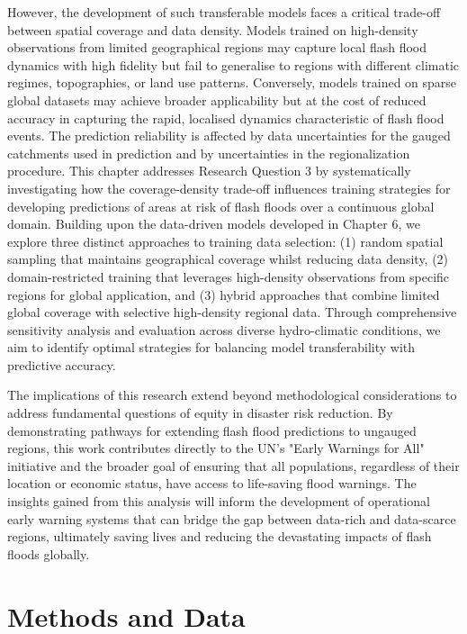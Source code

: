 However, the development of such transferable models faces a critical trade-off between spatial coverage and data density. Models trained on high-density observations from limited geographical regions may capture local flash flood dynamics with high fidelity but fail to generalise to regions with different climatic regimes, topographies, or land use patterns. Conversely, models trained on sparse global datasets may achieve broader applicability but at the cost of reduced accuracy in capturing the rapid, localised dynamics characteristic of flash flood events. The prediction reliability is affected by data uncertainties for the gauged catchments used in prediction and by uncertainties in the regionalization procedure.
This chapter addresses Research Question 3 by systematically investigating how the coverage-density trade-off influences training strategies for developing predictions of areas at risk of flash floods over a continuous global domain. Building upon the data-driven models developed in Chapter 6, we explore three distinct approaches to training data selection: (1) random spatial sampling that maintains geographical coverage whilst reducing data density, (2) domain-restricted training that leverages high-density observations from specific regions for global application, and (3) hybrid approaches that combine limited global coverage with selective high-density regional data. Through comprehensive sensitivity analysis and evaluation across diverse hydro-climatic conditions, we aim to identify optimal strategies for balancing model transferability with predictive accuracy.

The implications of this research extend beyond methodological considerations to address fundamental questions of equity in disaster risk reduction. By demonstrating pathways for extending flash flood predictions to ungauged regions, this work contributes directly to the UN's "Early Warnings for All" initiative and the broader goal of ensuring that all populations, regardless of their location or economic status, have access to life-saving flood warnings. The insights gained from this analysis will inform the development of operational early warning systems that can bridge the gap between data-rich and data-scarce regions, ultimately saving lives and reducing the devastating impacts of flash floods globally.


\section{Methods and Data}

